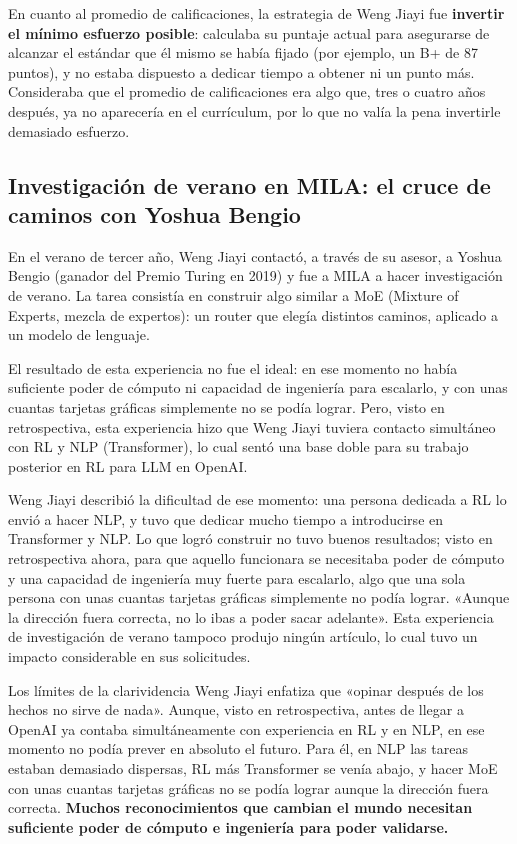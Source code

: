 \documentclass[a4paper]{article}
\begin{document}
En cuanto al promedio de calificaciones, la estrategia de Weng Jiayi fue \textbf{invertir el mínimo esfuerzo posible}: calculaba su puntaje actual para asegurarse de alcanzar el estándar que él mismo se había fijado (por ejemplo, un B+ de 87 puntos), y no estaba dispuesto a dedicar tiempo a obtener ni un punto más. Consideraba que el promedio de calificaciones era algo que, tres o cuatro años después, ya no aparecería en el currículum, por lo que no valía la pena invertirle demasiado esfuerzo.

\subsection{Investigación de verano en MILA: el cruce de caminos con Yoshua Bengio}

En el verano de tercer año, Weng Jiayi contactó, a través de su asesor, a Yoshua Bengio (ganador del Premio Turing en 2019) y fue a MILA a hacer investigación de verano. La tarea consistía en construir algo similar a MoE (Mixture of Experts, mezcla de expertos): un router que elegía distintos caminos, aplicado a un modelo de lenguaje.

El resultado de esta experiencia no fue el ideal: en ese momento no había suficiente poder de cómputo ni capacidad de ingeniería para escalarlo, y con unas cuantas tarjetas gráficas simplemente no se podía lograr. Pero, visto en retrospectiva, esta experiencia hizo que Weng Jiayi tuviera contacto simultáneo con RL y NLP (Transformer), lo cual sentó una base doble para su trabajo posterior en RL para LLM en OpenAI.

Weng Jiayi describió la dificultad de ese momento: una persona dedicada a RL lo envió a hacer NLP, y tuvo que dedicar mucho tiempo a introducirse en Transformer y NLP. Lo que logró construir no tuvo buenos resultados; visto en retrospectiva ahora, para que aquello funcionara se necesitaba poder de cómputo y una capacidad de ingeniería muy fuerte para escalarlo, algo que una sola persona con unas cuantas tarjetas gráficas simplemente no podía lograr. «Aunque la dirección fuera correcta, no lo ibas a poder sacar adelante». Esta experiencia de investigación de verano tampoco produjo ningún artículo, lo cual tuvo un impacto considerable en sus solicitudes.

\begin{warningbox}{Los límites de la clarividencia}
Weng Jiayi enfatiza que «opinar después de los hechos no sirve de nada». Aunque, visto en retrospectiva, antes de llegar a OpenAI ya contaba simultáneamente con experiencia en RL y en NLP, en ese momento no podía prever en absoluto el futuro. Para él, en NLP las tareas estaban demasiado dispersas, RL más Transformer se venía abajo, y hacer MoE con unas cuantas tarjetas gráficas no se podía lograr aunque la dirección fuera correcta. \textbf{Muchos reconocimientos que cambian el mundo necesitan suficiente poder de cómputo e ingeniería para poder validarse.}
\end{warningbox}
\end{document}
